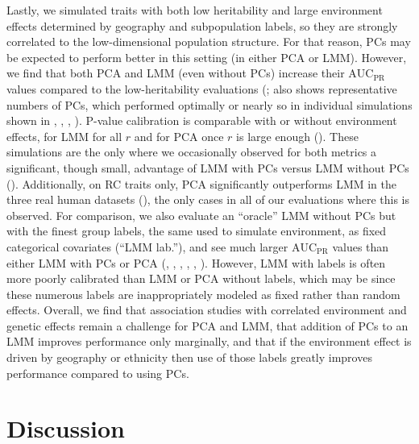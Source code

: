 \documentclass[9pt,lineno]{elife}
\newcommand{\auc}{\text{AUC}_\text{PR}}
\begin{document}
Lastly, we simulated traits with both low heritability and large environment effects determined by geography and subpopulation labels, so they are strongly correlated to the low-dimensional population structure.
For that reason, PCs may be expected to perform better in this setting (in either PCA or LMM).
However, we find that both PCA and LMM (even without PCs) increase their $\auc$ values compared to the low-heritability evaluations (;  also shows representative numbers of PCs, which performed optimally or nearly so in individual simulations shown in , , , ).
P-value calibration is comparable with or without environment effects, for LMM for all $r$ and for PCA once $r$ is large enough ().
These simulations are the only where we occasionally observed for both metrics a significant, though small, advantage of LMM with PCs versus LMM without PCs ().
Additionally, on RC traits only, PCA significantly outperforms LMM in the three real human datasets (), the only cases in all of our evaluations where this is observed.
For comparison, we also evaluate an ``oracle'' LMM without PCs but with the finest group labels, the same used to simulate environment, as fixed categorical covariates (``LMM lab.''), and see much larger $\auc$ values than either LMM with PCs or PCA (,
, , , , ).
However, LMM with labels is often more poorly calibrated than LMM or PCA without labels, which may be since these numerous labels are inappropriately modeled as fixed rather than random effects.
Overall, we find that association studies with correlated environment and genetic effects remain a challenge for PCA and LMM, that addition of PCs to an LMM improves performance only marginally, and that if the environment effect is driven by geography or ethnicity then use of those labels greatly improves performance compared to using PCs.

\section{Discussion}
\end{document}

